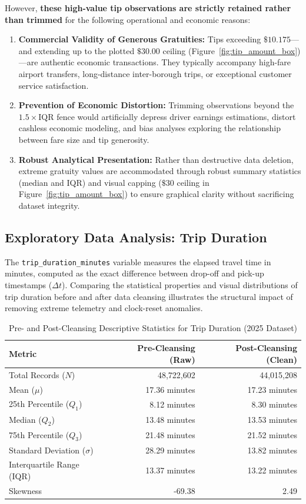 \documentclass[11pt,a4paper]{article}
\begin{document}
However, \textbf{these high-value tip observations are strictly retained rather than trimmed} for the following operational and economic reasons:
\begin{enumerate}
    \item \textbf{Commercial Validity of Generous Gratuities:} Tips exceeding $\$10.175$—and extending up to the plotted $\$30.00$ ceiling (Figure~\ref{fig:tip_amount_box})—are authentic economic transactions. They typically accompany high-fare airport transfers, long-distance inter-borough trips, or exceptional customer service satisfaction.
    \item \textbf{Prevention of Economic Distortion:} Trimming observations beyond the $1.5 \times \text{IQR}$ fence would artificially depress driver earnings estimations, distort cashless economic modeling, and bias analyses exploring the relationship between fare size and tip generosity.
    \item \textbf{Robust Analytical Presentation:} Rather than destructive data deletion, extreme gratuity values are accommodated through robust summary statistics (median and IQR) and visual capping ($\$30$ ceiling in Figure~\ref{fig:tip_amount_box}) to ensure graphical clarity without sacrificing dataset integrity.
\end{enumerate}

\subsection{Exploratory Data Analysis: Trip Duration}
\label{sec:eda_trip_duration}

The \texttt{trip\_duration\_minutes} variable measures the elapsed travel time in minutes, computed as the exact difference between drop-off and pick-up timestamps ($\Delta t$). Comparing the statistical properties and visual distributions of trip duration before and after data cleansing illustrates the structural impact of removing extreme telemetry and clock-reset anomalies.

\begin{table}[htbp]
\centering
\caption{Pre- and Post-Cleansing Descriptive Statistics for Trip Duration (2025 Dataset)}
\label{tab:stats_trip_duration_comparison}
\small
\begin{tabular}{lrr}
\toprule
\textbf{Metric} & \textbf{Pre-Cleansing (Raw)} & \textbf{Post-Cleansing (Clean)} \\
\midrule
Total Records ($N$) & 48,722,602 & 44,015,208 \\
Mean ($\mu$) & 17.36 minutes & 17.23 minutes \\
25th Percentile ($Q_1$) & 8.12 minutes & 8.30 minutes \\
Median ($Q_2$) & 13.48 minutes & 13.53 minutes \\
75th Percentile ($Q_3$) & 21.48 minutes & 21.52 minutes \\
Standard Deviation ($\sigma$) & 28.29 minutes & 13.82 minutes \\
Interquartile Range (IQR) & 13.37 minutes & 13.22 minutes \\
Skewness & -69.38 & 2.49 \\
\bottomrule
\end{tabular}
\end{table}
\end{document}
